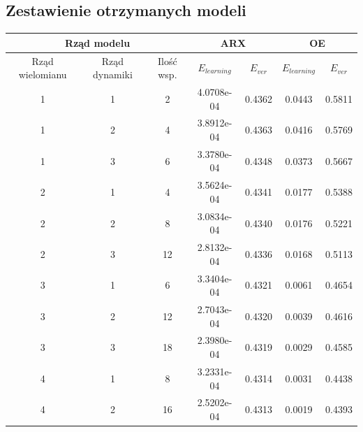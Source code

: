 \subsection{Zestawienie otrzymanych modeli}
\begin{table}[H]
\centering
\begin{tabular}{|c|c|c|c|c|c|c|}
\hline
\multicolumn{3}{|c|}{Rząd modelu}                      & \multicolumn{2}{c|}{ARX}   & \multicolumn{2}{c|}{OE}    \\ \hline
Rząd wielomianu & Rząd dynamiki & Ilość wsp. & $E_{learning}$ & $E_{ver}$ & $E_{learning}$ & $E_{ver}$ \\ \hline
1               & 1             &  2                  & 4.0708e-04              & 0.4362         & 0.0443              & 0.5811         \\ \hline
1               & 2             &  4                  & 3.8912e-04              & 0.4363         & 0.0416              & 0.5769         \\ \hline
1               & 3             &  6                  & 3.3780e-04              & 0.4348         & 0.0373              & 0.5667         \\ \hline
2               & 1             &  4                  & 3.5624e-04              & 0.4341         & 0.0177              & 0.5388         \\ \hline
2               & 2             &  8                  & 3.0834e-04              & 0.4340         & 0.0176              & 0.5221         \\ \hline
2               & 3             &  12                & 2.8132e-04              & 0.4336         & 0.0168              & 0.5113         \\ \hline
3               & 1             &  6                  & 3.3404e-04              & 0.4321         & 0.0061              & 0.4654         \\ \hline
3               & 2             &  12                & 2.7043e-04              & 0.4320         & 0.0039              & 0.4616         \\ \hline
3               & 3             &  18                & 2.3980e-04              & 0.4319         & 0.0029              & 0.4585         \\ \hline
4               & 1             &  8                  & 3.2331e-04              & 0.4314         & 0.0031              & 0.4438         \\ \hline
4               & 2             &  16                & 2.5202e-04              & 0.4313         & 0.0019              & 0.4393         \\ \hline

\end{tabular}
\end{table}
